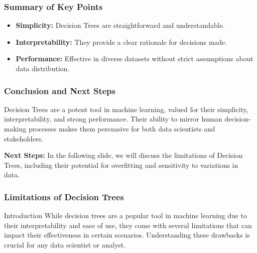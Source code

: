 \documentclass[aspectratio=169]{beamer}
\begin{document}
\begin{frame}[fragile]
    \frametitle{Summary of Key Points}

    \begin{itemize}
        \item \textbf{Simplicity:} Decision Trees are straightforward and understandable.
        \item \textbf{Interpretability:} They provide a clear rationale for decisions made.
        \item \textbf{Performance:} Effective in diverse datasets without strict assumptions about data distribution.
    \end{itemize}
\end{frame}

\begin{frame}[fragile]
    \frametitle{Conclusion and Next Steps}

    Decision Trees are a potent tool in machine learning, valued for their simplicity, interpretability, and strong performance. Their ability to mirror human decision-making processes makes them persuasive for both data scientists and stakeholders.

    \textbf{Next Steps:} 
    In the following slide, we will discuss the limitations of Decision Trees, including their potential for overfitting and sensitivity to variations in data.
\end{frame}

\begin{frame}[fragile]
  \frametitle{Limitations of Decision Trees}
  \begin{block}{Introduction}
    While decision trees are a popular tool in machine learning due to their interpretability and ease of use, they come with several limitations that can impact their effectiveness in certain scenarios. Understanding these drawbacks is crucial for any data scientist or analyst.
  \end{block}
\end{frame}
\end{document}
